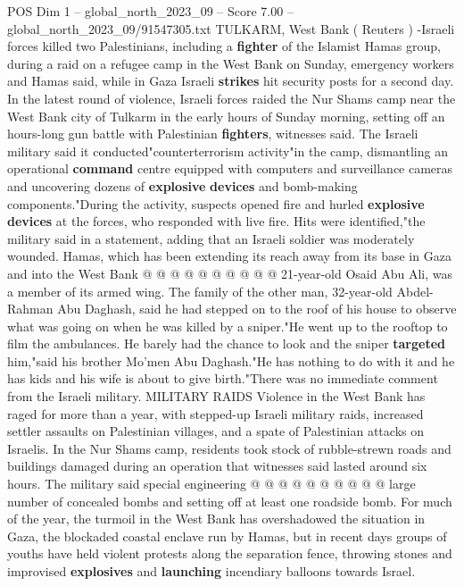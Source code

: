 \begin{textsample}{POS Dim 1 – global\_north\_2023\_09 – Score 7.00 – global\_north\_2023\_09/91547305.txt}  \label{ex:f1_pos_117}
TULKARM, West Bank ( Reuters ) -Israeli forces killed two Palestinians, including a \textbf{fighter} of the Islamist Hamas group, during a raid on a refugee camp in the West Bank on Sunday, emergency workers and Hamas said, while in Gaza Israeli \textbf{strikes} hit security posts for a second day.
In the latest round of violence, Israeli forces raided the Nur Shams camp near the West Bank city of Tulkarm in the early hours of Sunday morning, setting off an hours-long gun battle with Palestinian \textbf{fighters}, witnesses said.
The Israeli military said it conducted"counterterrorism activity"in the camp, dismantling an operational \textbf{command} centre equipped with computers and surveillance cameras and uncovering dozens of \textbf{explosive} \textbf{devices} and bomb-making components."During the activity, suspects opened fire and hurled \textbf{explosive} \textbf{devices} at the forces, who responded with live fire.
Hits were identified,"the military said in a statement, adding that an Israeli soldier was moderately wounded.
Hamas, which has been extending its reach away from its base in Gaza and into the West Bank @ @ @ @ @ @ @ @ @ @ 21-year-old Osaid Abu Ali, was a member of its armed wing.
The family of the other man, 32-year-old Abdel-Rahman Abu Daghash, said he had stepped on to the roof of his house to observe what was going on when he was killed by a sniper."He went up to the rooftop to film the ambulances.
He barely had the chance to look and the sniper \textbf{targeted} him,"said his brother Mo'men Abu Daghash."He has nothing to do with it and he has kids and his wife is about to give birth."There was no immediate comment from the Israeli military.
MILITARY RAIDS Violence in the West Bank has raged for more than a year, with stepped-up Israeli military raids, increased settler assaults on Palestinian villages, and a spate of Palestinian attacks on Israelis.
In the Nur Shams camp, residents took stock of rubble-strewn roads and buildings damaged during an operation that witnesses said lasted around six hours.
The military said special engineering @ @ @ @ @ @ @ @ @ @ large number of concealed bombs and setting off at least one roadside bomb.
For much of the year, the turmoil in the West Bank has overshadowed the situation in Gaza, the blockaded coastal enclave run by Hamas, but in recent days groups of youths have held violent protests along the separation fence, throwing stones and improvised \textbf{explosives} and \textbf{launching} incendiary balloons towards Israel.

\end{textsample}
